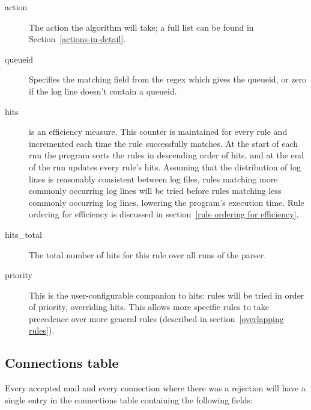 \documentclass[a4paper,12pt,draft]{article}
\begin{document}
\begin{description}
    \item [action] The action the algorithm will take; a full list can be
        found in Section~\ref{actions-in-detail}.

    \item [queueid] Specifies the matching field from the regex which gives
        the queueid, or zero if the log line doesn't contain a queueid.

    \item [hits] is an efficiency measure.  This counter is maintained for
        every rule and incremented each time the rule successfully matches.
        At the start of each run the program sorts the rules in descending
        order of hits, and at the end of the run updates every rule's hits.
        Assuming that the distribution of log lines is reasonably
        consistent between log files, rules matching more commonly
        occurring log lines will be tried before rules matching less
        commonly occurring log lines, lowering the program's execution
        time.  Rule ordering for efficiency is discussed in
        section~\ref{rule ordering for efficiency}.

    \item [hits\_total] The total number of hits for this rule over all
        runs of the parser.

    \item [priority] This is the user-configurable companion to hits: rules
        will be tried in order of priority, overriding hits.  This allows
        more specific rules to take precedence over more general rules
        (described in section~\ref{overlapping rules}).

\end{description}


\subsection{Connections table}

\label{connections table}

Every accepted mail and every connection where there was a rejection will
have a single entry in the connections table containing the following
fields:
\end{document}
